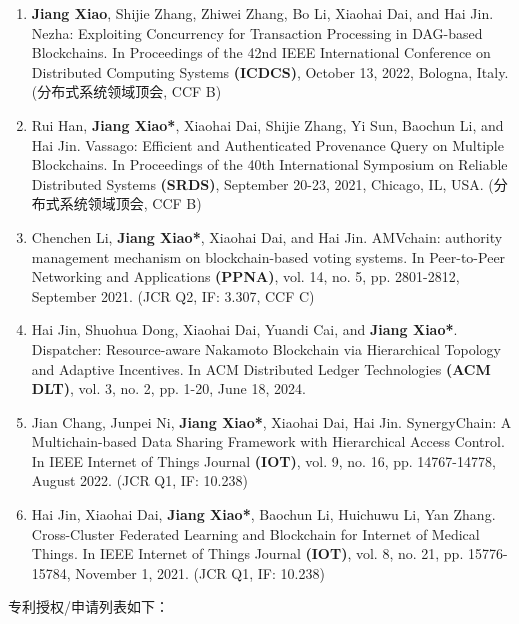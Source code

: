 \begin{enumerate}[itemsep=0pt, topsep=0pt, parsep=0pt]
    \item \textbf{Jiang Xiao}, Shijie Zhang, Zhiwei Zhang, Bo Li, Xiaohai Dai, and Hai Jin. Nezha: Exploiting Concurrency for Transaction Processing in DAG-based Blockchains. In Proceedings of the 42nd IEEE International Conference on Distributed Computing Systems \textbf{(ICDCS)}, October 13, 2022, Bologna, Italy. (分布式系统领域顶会, CCF B)

    \item Rui Han, \textbf{Jiang Xiao*}, Xiaohai Dai, Shijie Zhang, Yi Sun, Baochun Li, and Hai Jin. Vassago: Efficient and Authenticated Provenance Query on Multiple Blockchains. In Proceedings of the 40th International Symposium on Reliable Distributed Systems \textbf{(SRDS)}, September 20-23, 2021, Chicago, IL, USA. (分布式系统领域顶会, CCF B)

    \item Chenchen Li, \textbf{Jiang Xiao*}, Xiaohai Dai, and Hai Jin. AMVchain: authority management mechanism on blockchain-based voting systems. In Peer-to-Peer Networking and Applications \textbf{(PPNA)}, vol. 14, no. 5, pp. 2801-2812, September 2021. (JCR Q2, IF: 3.307, CCF C)

    \item Hai Jin, Shuohua Dong, Xiaohai Dai, Yuandi Cai, and \textbf{Jiang Xiao*}. Dispatcher: Resource-aware Nakamoto Blockchain via Hierarchical Topology and Adaptive Incentives. In ACM Distributed Ledger Technologies \textbf{(ACM DLT)}, vol. 3, no. 2, pp. 1-20, June 18, 2024.

    \item Jian Chang, Junpei Ni, \textbf{Jiang Xiao*}, Xiaohai Dai, Hai Jin. SynergyChain: A Multichain-based Data Sharing Framework with Hierarchical Access Control. In IEEE Internet of Things Journal \textbf{(IOT)}, vol. 9, no. 16, pp. 14767-14778, August 2022. (JCR Q1, IF: 10.238)

    \item Hai Jin, Xiaohai Dai, \textbf{Jiang Xiao*}, Baochun Li, Huichuwu Li, Yan Zhang. Cross-Cluster Federated Learning and Blockchain for Internet of Medical Things. In IEEE Internet of Things Journal \textbf{(IOT)}, vol. 8, no. 21, pp. 15776-15784, November 1, 2021. (JCR Q1, IF: 10.238)
\end{enumerate}

专利授权/申请列表如下：

